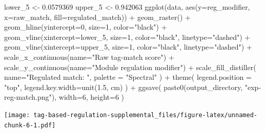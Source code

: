 \documentclass[
]{book}
\newenvironment{Shaded}{\begin{snugshade}}{\end{snugshade}}
\newcommand{\AttributeTok}[1]{\textcolor[rgb]{0.77,0.63,0.00}{#1}}
\newcommand{\DecValTok}[1]{\textcolor[rgb]{0.00,0.00,0.81}{#1}}
\newcommand{\FloatTok}[1]{\textcolor[rgb]{0.00,0.00,0.81}{#1}}
\newcommand{\FunctionTok}[1]{\textcolor[rgb]{0.00,0.00,0.00}{#1}}
\newcommand{\NormalTok}[1]{#1}
\newcommand{\OtherTok}[1]{\textcolor[rgb]{0.56,0.35,0.01}{#1}}
\newcommand{\SpecialCharTok}[1]{\textcolor[rgb]{0.00,0.00,0.00}{#1}}
\newcommand{\StringTok}[1]{\textcolor[rgb]{0.31,0.60,0.02}{#1}}
\begin{document}
\begin{Shaded}
\begin{Highlighting}[]
\NormalTok{lower\_5 }\OtherTok{\textless{}{-}} \FloatTok{0.0579369}
\NormalTok{upper\_5 }\OtherTok{\textless{}{-}} \FloatTok{0.942063}
\FunctionTok{ggplot}\NormalTok{(data, }\FunctionTok{aes}\NormalTok{(}\AttributeTok{y=}\NormalTok{reg\_modifier, }\AttributeTok{x=}\NormalTok{raw\_match, }\AttributeTok{fill=}\NormalTok{regulated\_match)) }\SpecialCharTok{+}
  \FunctionTok{geom\_raster}\NormalTok{() }\SpecialCharTok{+}
  \FunctionTok{geom\_hline}\NormalTok{(}\AttributeTok{yintercept=}\DecValTok{0}\NormalTok{, }\AttributeTok{size=}\DecValTok{1}\NormalTok{, }\AttributeTok{color=}\StringTok{"black"}\NormalTok{) }\SpecialCharTok{+}
  \FunctionTok{geom\_vline}\NormalTok{(}\AttributeTok{xintercept=}\NormalTok{lower\_5, }\AttributeTok{size=}\DecValTok{1}\NormalTok{, }\AttributeTok{color=}\StringTok{"black"}\NormalTok{, }\AttributeTok{linetype=}\StringTok{"dashed"}\NormalTok{) }\SpecialCharTok{+}
  \FunctionTok{geom\_vline}\NormalTok{(}\AttributeTok{xintercept=}\NormalTok{upper\_5, }\AttributeTok{size=}\DecValTok{1}\NormalTok{, }\AttributeTok{color=}\StringTok{"black"}\NormalTok{, }\AttributeTok{linetype=}\StringTok{"dashed"}\NormalTok{) }\SpecialCharTok{+}
  \FunctionTok{scale\_x\_continuous}\NormalTok{(}\AttributeTok{name=}\StringTok{"Raw tag{-}match score"}\NormalTok{) }\SpecialCharTok{+}
  \FunctionTok{scale\_y\_continuous}\NormalTok{(}\AttributeTok{name=}\StringTok{"Module regulation modifier"}\NormalTok{) }\SpecialCharTok{+}
  \FunctionTok{scale\_fill\_distiller}\NormalTok{(}
    \AttributeTok{name=}\StringTok{"Regulated match:  "}\NormalTok{,}
    \AttributeTok{palette =} \StringTok{"Spectral"}
\NormalTok{  ) }\SpecialCharTok{+}
  \FunctionTok{theme}\NormalTok{(}
    \AttributeTok{legend.position =} \StringTok{"top"}\NormalTok{,}
    \AttributeTok{legend.key.width=}\FunctionTok{unit}\NormalTok{(}\FloatTok{1.5}\NormalTok{, }\StringTok{\textquotesingle{}cm\textquotesingle{}}\NormalTok{)}
\NormalTok{  ) }\SpecialCharTok{+}
  \FunctionTok{ggsave}\NormalTok{(}
    \FunctionTok{paste0}\NormalTok{(output\_directory, }\StringTok{"exp{-}reg{-}match.png"}\NormalTok{),}
    \AttributeTok{width=}\DecValTok{6}\NormalTok{,}
    \AttributeTok{height=}\DecValTok{6}
\NormalTok{  )}
\end{Highlighting}
\end{Shaded}

\texttt{[image: tag-based-regulation-supplemental\_files/figure-latex/unnamed-chunk-6-1.pdf]}
\end{document}
